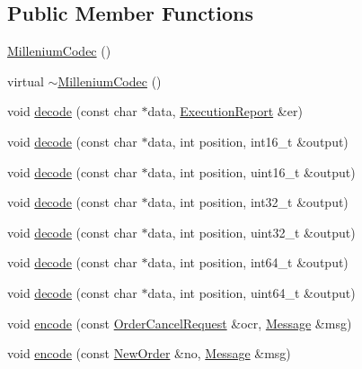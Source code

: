 \subsection*{Public Member Functions}
\begin{DoxyCompactItemize}
\item 
\hyperlink{classMetal_1_1LSE_1_1MilleniumCodec_a0c9cd11215bd4e609fa6cd3a46bab77a}{Millenium\+Codec} ()
\item 
virtual \hyperlink{classMetal_1_1LSE_1_1MilleniumCodec_a2ecaf49322a654f6346130c869e8a05b}{$\sim$\+Millenium\+Codec} ()
\item 
void \hyperlink{classMetal_1_1LSE_1_1MilleniumCodec_ae084aba2c7ebff235c983a5b777f7aee}{decode} (const char $\ast$data, \hyperlink{classMetal_1_1LSE_1_1ExecutionReport}{Execution\+Report} \&er)
\item 
void \hyperlink{classMetal_1_1LSE_1_1MilleniumCodec_a27d224f443abb2cdbb90fcf6d95d2aaf}{decode} (const char $\ast$data, int position, int16\+\_\+t \&output)
\item 
void \hyperlink{classMetal_1_1LSE_1_1MilleniumCodec_a533ce6fb2cb0c35e096d6de68a5f30a2}{decode} (const char $\ast$data, int position, uint16\+\_\+t \&output)
\item 
void \hyperlink{classMetal_1_1LSE_1_1MilleniumCodec_a4236eaaa48563dbd38cca7da24e3da31}{decode} (const char $\ast$data, int position, int32\+\_\+t \&output)
\item 
void \hyperlink{classMetal_1_1LSE_1_1MilleniumCodec_a65f4edba8b97d4981437f8d9fb02e185}{decode} (const char $\ast$data, int position, uint32\+\_\+t \&output)
\item 
void \hyperlink{classMetal_1_1LSE_1_1MilleniumCodec_a85d8df2938f1b9f7bab2a9c3cf431f1c}{decode} (const char $\ast$data, int position, int64\+\_\+t \&output)
\item 
void \hyperlink{classMetal_1_1LSE_1_1MilleniumCodec_a7fe06dba070cdc4627f5be9e0cfa7961}{decode} (const char $\ast$data, int position, uint64\+\_\+t \&output)
\item 
void \hyperlink{classMetal_1_1LSE_1_1MilleniumCodec_a0db727988a60b489983d3650c2dbb5fd}{encode} (const \hyperlink{classMetal_1_1LSE_1_1OrderCancelRequest}{Order\+Cancel\+Request} \&ocr, \hyperlink{classMetal_1_1Message}{Message} \&msg)
\item 
void \hyperlink{classMetal_1_1LSE_1_1MilleniumCodec_a90425eb0c5be795fb6c35fc28a88aac1}{encode} (const \hyperlink{classMetal_1_1LSE_1_1NewOrder}{New\+Order} \&no, \hyperlink{classMetal_1_1Message}{Message} \&msg)
\item 

\end{DoxyCompactItemize}
